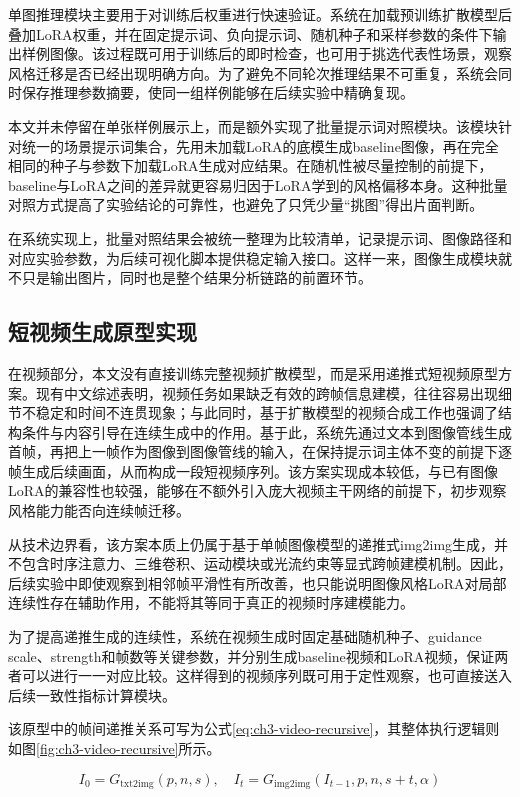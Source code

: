 单图推理模块主要用于对训练后权重进行快速验证。系统在加载预训练扩散模型后叠加LoRA权重，并在固定提示词、负向提示词、随机种子和采样参数的条件下输出样例图像。该过程既可用于训练后的即时检查，也可用于挑选代表性场景，观察风格迁移是否已经出现明确方向。为了避免不同轮次推理结果不可重复，系统会同时保存推理参数摘要，使同一组样例能够在后续实验中精确复现。

本文并未停留在单张样例展示上，而是额外实现了批量提示词对照模块。该模块针对统一的场景提示词集合，先用未加载LoRA的底模生成baseline图像，再在完全相同的种子与参数下加载LoRA生成对应结果。在随机性被尽量控制的前提下，baseline与LoRA之间的差异就更容易归因于LoRA学到的风格偏移本身。这种批量对照方式提高了实验结论的可靠性，也避免了只凭少量“挑图”得出片面判断。

在系统实现上，批量对照结果会被统一整理为比较清单，记录提示词、图像路径和对应实验参数，为后续可视化脚本提供稳定输入接口。这样一来，图像生成模块就不只是输出图片，同时也是整个结果分析链路的前置环节。

\subsection{短视频生成原型实现}

在视频部分，本文没有直接训练完整视频扩散模型，而是采用递推式短视频原型方案。现有中文综述表明，视频任务如果缺乏有效的跨帧信息建模，往往容易出现细节不稳定和时间不连贯现象\cite{ref37}；与此同时，基于扩散模型的视频合成工作也强调了结构条件与内容引导在连续生成中的作用\cite{ref38}。基于此，系统先通过文本到图像管线生成首帧，再把上一帧作为图像到图像管线的输入，在保持提示词主体不变的前提下逐帧生成后续画面，从而构成一段短视频序列。该方案实现成本较低，与已有图像LoRA的兼容性也较强，能够在不额外引入庞大视频主干网络的前提下，初步观察风格能力能否向连续帧迁移。

从技术边界看，该方案本质上仍属于基于单帧图像模型的递推式img2img生成，并不包含时序注意力、三维卷积、运动模块或光流约束等显式跨帧建模机制。因此，后续实验中即使观察到相邻帧平滑性有所改善，也只能说明图像风格LoRA对局部连续性存在辅助作用，不能将其等同于真正的视频时序建模能力。

为了提高递推生成的连续性，系统在视频生成时固定基础随机种子、guidance scale、strength和帧数等关键参数，并分别生成baseline视频和LoRA视频，保证两者可以进行一一对应比较。这样得到的视频序列既可用于定性观察，也可直接送入后续一致性指标计算模块。

该原型中的帧间递推关系可写为公式\ref{eq:ch3-video-recursive}，其整体执行逻辑则如图\ref{fig:ch3-video-recursive}所示。

\begin{equation}
I_0 = G_{\mathrm{txt2img}}(p, n, s), \quad I_t = G_{\mathrm{img2img}}(I_{t-1}, p, n, s+t, \alpha)
\label{eq:ch3-video-recursive}
\end{equation}

